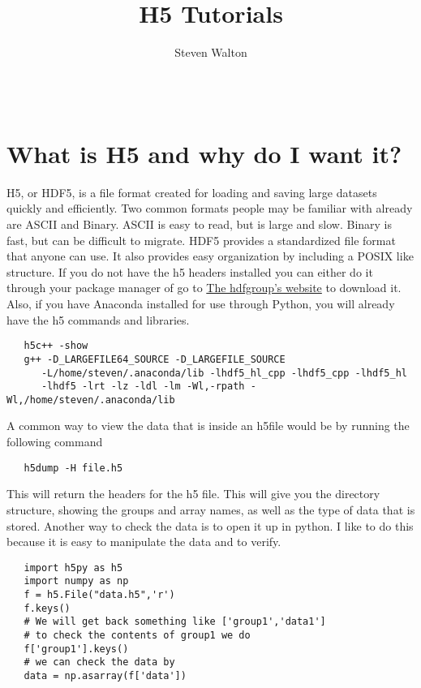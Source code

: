 \documentclass[11pt]{article}   %
\title{H5 Tutorials}
\author{Steven Walton\\     %
\text{walton\{dot\}stevenj\{at\}gmail\{dot\}com}\\
\text{\href{https://github.com/stevenwalton/tutorials}{https://github.com/stevenwalton/tutorials}}\\
\text{Last Updated:}}
\begin{document}
\maketitle

\section*{What is H5 and why do I want it?}
H5, or HDF5, is a file format created for loading and saving large datasets quickly and efficiently. Two common formats people may be familiar with already
are ASCII and Binary. ASCII is easy to read, but is large and slow. Binary is fast, but can be difficult to migrate. HDF5 provides a standardized file format
that anyone can use. It also provides easy organization by including a POSIX like structure. If you do not have the h5 headers installed you can either do it
through your package manager of go to \href{https://www.hdfgroup.org/downloads/index.html}{The hdfgroup's website} to download it. Also, if you have Anaconda
installed for use through Python, you will already have the h5 commands and libraries.
\begin{tcolorbox}
   \begin{lstlisting}
   h5c++ -show
   g++ -D_LARGEFILE64_SOURCE -D_LARGEFILE_SOURCE 
      -L/home/steven/.anaconda/lib -lhdf5_hl_cpp -lhdf5_cpp -lhdf5_hl 
      -lhdf5 -lrt -lz -ldl -lm -Wl,-rpath -Wl,/home/steven/.anaconda/lib
   \end{lstlisting}
\end{tcolorbox}
A common way to view the data that is inside an h5file would be by running the following command
\begin{tcolorbox}
   \begin{lstlisting}
   h5dump -H file.h5
   \end{lstlisting}
\end{tcolorbox}
This will return the headers for the h5 file. This will give you the directory structure, showing the groups and array names, as well as the type of data that
is stored. Another way to check the data is to open it up in python. I like to do this because it is easy to manipulate the data and to verify.
\begin{tcolorbox}
   \begin{lstlisting}
   import h5py as h5
   import numpy as np
   f = h5.File("data.h5",'r')
   f.keys()
   # We will get back something like ['group1','data1']
   # to check the contents of group1 we do
   f['group1'].keys()
   # we can check the data by
   data = np.asarray(f['data'])
   \end{lstlisting}
\end{tcolorbox}
\end{document}
